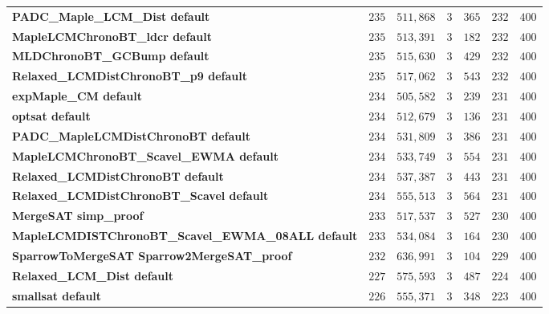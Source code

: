\begin{tabular}{lllllll}
\textbf{PADC_Maple_LCM_Dist default                   } &  $235$ &    $511,868$ &          $3$ &      $365$ &          $232$ &  $400$ \\
\textbf{MapleLCMChronoBT_ldcr default                 } &  $235$ &    $513,391$ &          $3$ &      $182$ &          $232$ &  $400$ \\
\textbf{MLDChronoBT_GCBump default                    } &  $235$ &    $515,630$ &          $3$ &      $429$ &          $232$ &  $400$ \\
\textbf{Relaxed_LCMDistChronoBT_p9 default            } &  $235$ &    $517,062$ &          $3$ &      $543$ &          $232$ &  $400$ \\
\textbf{expMaple_CM default                           } &  $234$ &    $505,582$ &          $3$ &      $239$ &          $231$ &  $400$ \\
\textbf{optsat default                                } &  $234$ &    $512,679$ &          $3$ &      $136$ &          $231$ &  $400$ \\
\textbf{PADC_MapleLCMDistChronoBT default             } &  $234$ &    $531,809$ &          $3$ &      $386$ &          $231$ &  $400$ \\
\textbf{MapleLCMChronoBT_Scavel_EWMA default          } &  $234$ &    $533,749$ &          $3$ &      $554$ &          $231$ &  $400$ \\
\textbf{Relaxed_LCMDistChronoBT default               } &  $234$ &    $537,387$ &          $3$ &      $443$ &          $231$ &  $400$ \\
\textbf{Relaxed_LCMDistChronoBT_Scavel default        } &  $234$ &    $555,513$ &          $3$ &      $564$ &          $231$ &  $400$ \\
\textbf{MergeSAT simp_proof                           } &  $233$ &    $517,537$ &          $3$ &      $527$ &          $230$ &  $400$ \\
\textbf{MapleLCMDISTChronoBT_Scavel_EWMA_08ALL default} &  $233$ &    $534,084$ &          $3$ &      $164$ &          $230$ &  $400$ \\
\textbf{SparrowToMergeSAT Sparrow2MergeSAT_proof      } &  $232$ &    $636,991$ &          $3$ &      $104$ &          $229$ &  $400$ \\
\textbf{Relaxed_LCM_Dist default                      } &  $227$ &    $575,593$ &          $3$ &      $487$ &          $224$ &  $400$ \\
\textbf{smallsat default                              } &  $226$ &    $555,371$ &          $3$ &      $348$ &          $223$ &  $400$ \\

\end{tabular}
